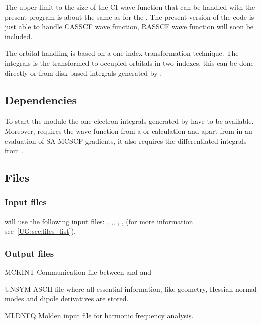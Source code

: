 The upper limit to the size of the CI wave function that can be
handled with the present program is about  the same as for the .
The present version of the code is just able to handle CASSCF wave function, RASSCF
wave function will soon be included.

The orbital handling is based on a one index transformation technique.
The integrals is the transformed to occupied orbitals in two indexes,
this can be done directly or from disk based integrals generated by .


\subsection{Dependencies}
\label{UG:sec:mclr_dependencies}
To start the  module the one{-}electron integrals generated by
 have to be available. Moreover,  requires
the wave function from a  or  calculation and
apart from in an evaluation of SA-MCSCF gradients, it also requires the differentiated integrals
from .

\subsection{Files}
\label{UG:sec:mclr_files}

\subsubsection{Input files}
\label{UG:sec:mclr_input_files}
 will use the following input
files: , ,, ,
, 
(for more information see~\ref{UG:sec:files_list}).


\subsubsection{Output files}
\label{UG:sec:mclr_output_files}

\begin{filelist}
\item[MCKINT]
Communication file between  and  and 
\item[UNSYM]
ASCII file where all essential information, like geometry, Hessian normal modes and dipole
derivatives are stored.
\item[MLDNFQ]
Molden input file for harmonic frequency analysis.
\end{filelist}


